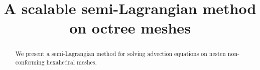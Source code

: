 \documentclass[11pt]{article}
\title{A scalable semi-Lagrangian method on octree meshes}
\author{}
\begin{document}
\maketitle

\begin{abstract}
We present a semi-Lagrangian method for solving advection equations
on nesten non-conforming hexahedral meshes.
\end{abstract}
\end{document}
